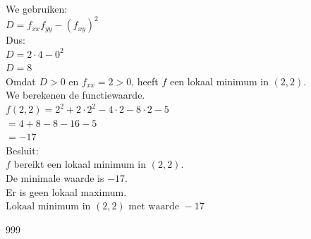 \documentclass[a4paper]{article}
\begin{document}
We gebruiken:\\

$D=f_{xx}f_{yy}-(f_{xy})^2$\\

Dus:\\

$D=2\cdot4-0^2$\\

$D=8$\\

Omdat $D>0$ en $f_{xx}=2>0$, heeft $f$ een lokaal minimum in $(2,2)$.\\

We berekenen de functiewaarde.\\

$f(2,2)=2^2+2\cdot2^2-4\cdot2-8\cdot2-5$\\

$=4+8-8-16-5$\\

$=-17$\\

Besluit:\\

$f$ bereikt een lokaal minimum in $(2,2)$.\\

De minimale waarde is $-17$.\\

Er is geen lokaal maximum.\\

$\boxed{\text{Lokaal minimum in }(2,2)\text{ met waarde }-17}$\\

\begin{thebibliography}{999}
\end{thebibliography}
\end{document}
